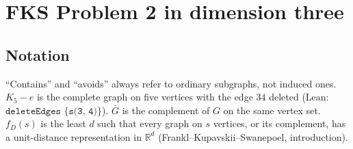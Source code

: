 %
%
%
%

\chapter{FKS Problem 2 in dimension three}

\section{Notation}

``Contains'' and ``avoids'' always refer to ordinary subgraphs, not induced ones.
$K_5 - e$ is the complete graph on five vertices with the edge $34$ deleted (Lean:
$\texttt{deleteEdges \{s(3, 4)\}}$). $\overline G$ is the complement of $G$ on the same
vertex set. $f_D(s)$ is the least $d$ such that every graph on $s$ vertices, or its
complement, has a unit-distance representation in $\mathbb{R}^d$
(Frankl--Kupavskii--Swanepoel, introduction).

